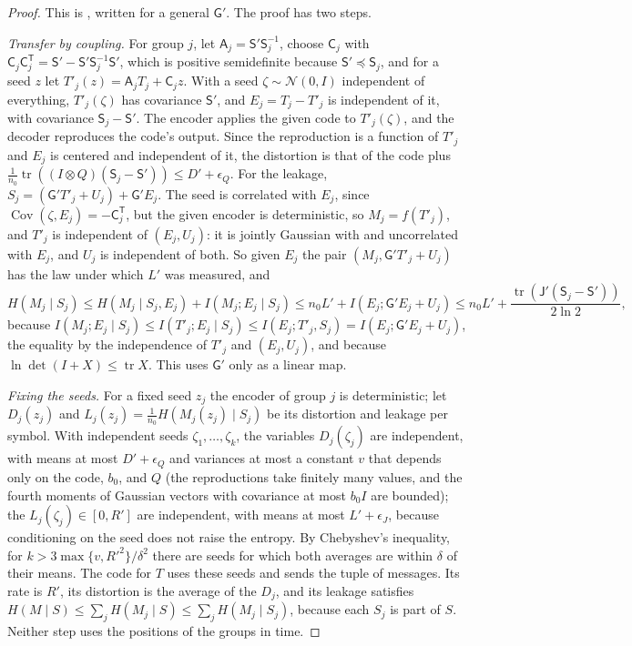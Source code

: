 \documentclass[11pt,onecolumn]{IEEEtran}
\newcommand{\tr}{\operatorname{tr}}
\newcommand{\Cov}{\operatorname{Cov}}
\begin{document}
\begin{proof}
This is \cite[Lemmas~11 and~12]{part3}, written for a general $\mathsf G'$.
The proof has two steps.

\emph{Transfer by coupling.} For group $j$, let
$\mathsf A_j=\mathsf S'\mathsf S_j^{-1}$, choose $\mathsf C_j$ with
$\mathsf C_j\mathsf C_j^{\mathsf T}=\mathsf S'-\mathsf S'\mathsf S_j^{-1}\mathsf S'$,
which is positive semidefinite because $\mathsf S'\preceq\mathsf S_j$, and
for a seed $z$ let $T'_j(z)=\mathsf A_jT_j+\mathsf C_jz$. With a seed
$\zeta\sim\mathcal N(0,I)$ independent of everything, $T'_j(\zeta)$ has
covariance $\mathsf S'$, and $E_j=T_j-T'_j$ is independent of it, with
covariance $\mathsf S_j-\mathsf S'$. The encoder applies the given code to
$T'_j(\zeta)$, and the decoder reproduces the code's output. Since the
reproduction is a function of $T'_j$ and $E_j$ is centered and
independent of it, the distortion is that of the code plus
$\tfrac1{n_0}\tr((I\otimes Q)(\mathsf S_j-\mathsf S'))\le D'+\epsilon_Q$. For the
leakage, $S_j=(\mathsf G'T'_j+U_j)+\mathsf G'E_j$. The seed is correlated
with $E_j$, since $\Cov(\zeta,E_j)=-\mathsf C_j^{\mathsf T}$, but the given
encoder is deterministic, so $M_j=f(T'_j)$, and $T'_j$ is independent of
$(E_j,U_j)$: it is jointly Gaussian with and uncorrelated with $E_j$, and
$U_j$ is independent of both. So given $E_j$ the pair
$(M_j,\mathsf G'T'_j+U_j)$ has the law under which $L'$ was measured, and
\[
H(M_j\mid S_j)\le H(M_j\mid S_j,E_j)+I(M_j;E_j\mid S_j)\le n_0L'+I(E_j;\mathsf G'E_j+U_j)\le n_0L'+\frac{\tr(\mathsf J'(\mathsf S_j-\mathsf S'))}{2\ln2},
\]
because
$I(M_j;E_j\mid S_j)\le I(T'_j;E_j\mid S_j)\le I(E_j;T'_j,S_j)=I(E_j;\mathsf G'E_j+U_j)$,
the equality by the independence of $T'_j$ and $(E_j,U_j)$, and because
$\ln\det(I+X)\le\tr X$. This uses $\mathsf G'$ only as a linear map.

\emph{Fixing the seeds.} For a fixed seed $z_j$ the encoder of group $j$
is deterministic; let $D_j(z_j)$ and $L_j(z_j)=\tfrac1{n_0}H(M_j(z_j)\mid S_j)$
be its distortion and leakage per symbol. With independent seeds
$\zeta_1,\dots,\zeta_k$, the variables $D_j(\zeta_j)$ are independent, with
means at most $D'+\epsilon_Q$ and variances at most a constant $v$ that
depends only on the code, $b_0$, and $Q$ (the reproductions take finitely
many values, and the fourth moments of Gaussian vectors with covariance
at most $b_0I$ are bounded); the $L_j(\zeta_j)\in[0,R']$ are independent,
with means at most $L'+\epsilon_J$, because conditioning on the seed does
not raise the entropy. By Chebyshev's inequality, for
$k>3\max\{v,R'^2\}/\delta^2$ there are seeds for which both averages are
within $\delta$ of their means. The code for $T$ uses these seeds and
sends the tuple of messages. Its rate is $R'$, its distortion is the
average of the $D_j$, and its leakage satisfies
$H(M\mid S)\le\sum_jH(M_j\mid S)\le\sum_jH(M_j\mid S_j)$, because each $S_j$
is part of $S$. Neither step uses the positions of the groups in time.
\end{proof}
\end{document}
